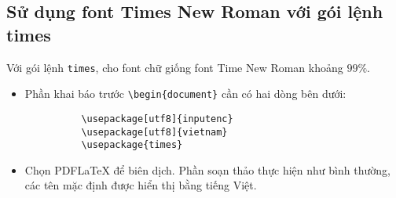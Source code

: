 \documentclass[12pt,a4paper]{article}
\begin{document}
\subsection{Sử dụng font Times New Roman với gói lệnh times}
Với gói lệnh \verb|times|, cho font chữ giống font Time New Roman khoảng $99\%$.
\begin{itemize}
  \item Phần khai báo trước \verb|\begin{document}| cần có hai dòng bên dưới:
        \begin{verbatim}
          \usepackage[utf8]{inputenc}
          \usepackage[utf8]{vietnam}
          \usepackage{times}
        \end{verbatim}

  \item Chọn PDFLaTeX để biên dịch. Phần soạn thảo thực hiện như bình thường, các tên mặc định được hiển thị bằng tiếng Việt.
\end{itemize}
\end{document}
